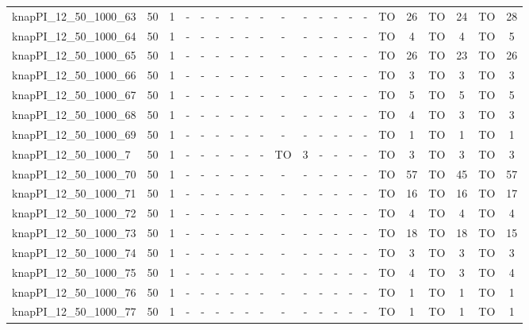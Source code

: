 \begin{sidewaystable}[!ht]
{\begin{tabular}{lcccccccccccccccccccc}
knapPI\_12\_50\_1000\_63 & 50 & 1 &  - &  - &  - &  - &  - &  - &  - &  - &  - &  - &  - &  - & TO & 26 & TO & 24 & TO & 28 \\
knapPI\_12\_50\_1000\_64 & 50 & 1 &  - &  - &  - &  - &  - &  - &  - &  - &  - &  - &  - &  - & TO & 4 & TO & 4 & TO & 5 \\
knapPI\_12\_50\_1000\_65 & 50 & 1 &  - &  - &  - &  - &  - &  - &  - &  - &  - &  - &  - &  - & TO & 26 & TO & 23 & TO & 26 \\
knapPI\_12\_50\_1000\_66 & 50 & 1 &  - &  - &  - &  - &  - &  - &  - &  - &  - &  - &  - &  - & TO & 3 & TO & 3 & TO & 3 \\
knapPI\_12\_50\_1000\_67 & 50 & 1 &  - &  - &  - &  - &  - &  - &  - &  - &  - &  - &  - &  - & TO & 5 & TO & 5 & TO & 5 \\
knapPI\_12\_50\_1000\_68 & 50 & 1 &  - &  - &  - &  - &  - &  - &  - &  - &  - &  - &  - &  - & TO & 4 & TO & 3 & TO & 3 \\
knapPI\_12\_50\_1000\_69 & 50 & 1 &  - &  - &  - &  - &  - &  - &  - &  - &  - &  - &  - &  - & TO & 1 & TO & 1 & TO & 1 \\
knapPI\_12\_50\_1000\_7 & 50 & 1 &  - &  - &  - &  - &  - &  - & TO & 3 &  - &  - &  - &  - & TO & 3 & TO & 3 & TO & 3 \\
knapPI\_12\_50\_1000\_70 & 50 & 1 &  - &  - &  - &  - &  - &  - &  - &  - &  - &  - &  - &  - & TO & 57 & TO & 45 & TO & 57 \\
knapPI\_12\_50\_1000\_71 & 50 & 1 &  - &  - &  - &  - &  - &  - &  - &  - &  - &  - &  - &  - & TO & 16 & TO & 16 & TO & 17 \\
knapPI\_12\_50\_1000\_72 & 50 & 1 &  - &  - &  - &  - &  - &  - &  - &  - &  - &  - &  - &  - & TO & 4 & TO & 4 & TO & 4 \\
knapPI\_12\_50\_1000\_73 & 50 & 1 &  - &  - &  - &  - &  - &  - &  - &  - &  - &  - &  - &  - & TO & 18 & TO & 18 & TO & 15 \\
knapPI\_12\_50\_1000\_74 & 50 & 1 &  - &  - &  - &  - &  - &  - &  - &  - &  - &  - &  - &  - & TO & 3 & TO & 3 & TO & 3 \\
knapPI\_12\_50\_1000\_75 & 50 & 1 &  - &  - &  - &  - &  - &  - &  - &  - &  - &  - &  - &  - & TO & 4 & TO & 3 & TO & 4 \\
knapPI\_12\_50\_1000\_76 & 50 & 1 &  - &  - &  - &  - &  - &  - &  - &  - &  - &  - &  - &  - & TO & 1 & TO & 1 & TO & 1 \\
knapPI\_12\_50\_1000\_77 & 50 & 1 &  - &  - &  - &  - &  - &  - &  - &  - &  - &  - &  - &  - & TO & 1 & TO & 1 & TO & 1 \\

\end{tabular}}
\end{sidewaystable}
